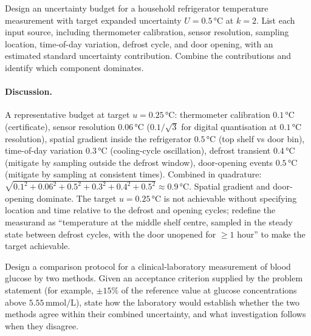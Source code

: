 \begin{exercise}
Design an uncertainty budget for a household refrigerator
temperature measurement with target expanded uncertainty
$U = 0.5 \,\si{\degreeCelsius}$ at $k = 2$. List each input source,
including thermometer calibration, sensor resolution, sampling
location, time-of-day variation, defrost cycle, and door opening,
with an estimated standard uncertainty contribution. Combine the
contributions and identify which component dominates.
\end{exercise}

\paragraph{Discussion.}
A representative budget at target $u = 0.25 \,\si{\degreeCelsius}$:
thermometer calibration $0.1 \,\si{\degreeCelsius}$
(certificate), sensor resolution $0.06 \,\si{\degreeCelsius}$
($0.1/\sqrt{3}$ for digital quantisation at $0.1 \,\si
{\degreeCelsius}$ resolution), spatial gradient inside the
refrigerator $0.5 \,\si{\degreeCelsius}$ (top shelf vs door
bin), time-of-day variation $0.3 \,\si{\degreeCelsius}$
(cooling-cycle oscillation), defrost transient
$0.4 \,\si{\degreeCelsius}$ (mitigate by sampling outside the
defrost window), door-opening events $0.5 \,\si{\degreeCelsius}$
(mitigate by sampling at consistent times). Combined in quadrature:
$\sqrt{0.1^{2} + 0.06^{2} + 0.5^{2} + 0.3^{2} + 0.4^{2} + 0.5^{2}}
\approx 0.9 \,\si{\degreeCelsius}$. Spatial gradient and door-
opening dominate. The target $u = 0.25 \,\si{\degreeCelsius}$ is
not achievable without specifying location and time relative to
the defrost and opening cycles; redefine the measurand as
``temperature at the middle shelf centre, sampled in the steady
state between defrost cycles, with the door unopened for
$\geq 1$ hour'' to make the target achievable.

\begin{exercise}
Design a comparison protocol for a clinical-laboratory measurement
of blood glucose by two methods. Given an acceptance criterion
supplied by the problem statement (for example, $\pm 15\%$ of the
reference value at glucose concentrations above
$5.55 \,\si{\milli\mol\per\liter}$), state how the laboratory would
establish whether the two methods agree within their combined
uncertainty, and what investigation follows when they disagree.
\end{exercise}

